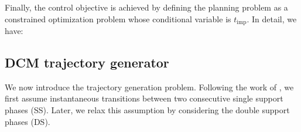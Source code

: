 Finally, the control objective is achieved by defining the planning problem as a constrained optimization problem whose conditional variable is $t_{\text{imp}}$. In detail, we have:


\subsection{DCM trajectory generator \label{sec:dcm_traj_gen}}
We now introduce the trajectory generation problem. Following the work of \cite{Englsberger2014}, we first assume instantaneous transitions between two consecutive single support phases (SS).
Later, we relax this assumption by considering the double support phases (DS).

